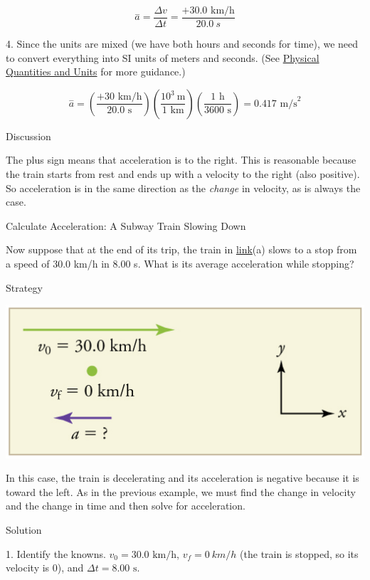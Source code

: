 \documentclass[
]{book}
\begin{document}
\leavevmode{}%
\[{{\overset{-}{a} = \frac{\Delta v}{\Delta t}} = \frac{+ \text{30.0\ km/h}}{\text{20}\text{.}0\ s}}{}\]

4. Since the units are mixed (we have both hours and seconds for time),
we need to convert everything into SI units of meters and seconds. (See
\href{/m54765}{Physical Quantities and Units} for more guidance.)

\leavevmode{}%
\[{{\overset{-}{a} = \left( \frac{+ \text{30\ km/h}}{\text{20.0\ s}} \right)}\left( \frac{\text{10}^{3}\ \text{m}}{\text{1\ km}} \right){\left( \frac{\text{1\ h}}{\text{3600\ s}} \right) = 0}\text{.}\text{417\ m/s}^{2}}{}\]

{Discussion}

The plus sign means that acceleration is to the right. This is
reasonable because the train starts from rest and ends up with a
velocity to the right (also positive). So acceleration is in the same
direction as the \emph{change} in velocity, as is always the case.

\hypertarget{fs-id3600466}{}
Calculate Acceleration: A Subway Train Slowing Down

Now suppose that at the end of its trip, the train in
\protect\hyperlink{import-auto-id2590556}{link}(a) slows to a
stop from a speed of 30.0 km/h in 8.00 s. What is its average
acceleration while stopping?

{Strategy}

\includegraphics{images/Figure_02_03_03d.jpg}

In this case, the train is decelerating and its acceleration is negative
because it is toward the left. As in the previous example, we must find
the change in velocity and the change in time and then solve for
acceleration.

{Solution}

1. Identify the knowns. \({{v_{0} = \text{30}}\text{.0\ km/h}}{}\),
\({v_{f} = 0\ km/h}{}\) (the train is stopped, so its velocity is 0), and
\({\Delta t =}\text{8.00\ s}\).
\end{document}
